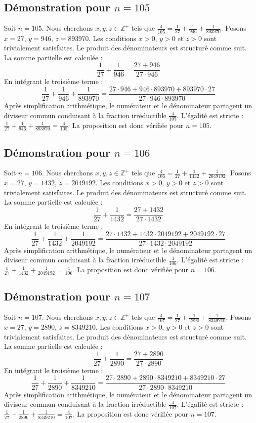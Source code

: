 \documentclass[11pt,a4paper]{article}
\begin{document}
\subsection{Démonstration pour $n = 105$}
Soit $n = 105$. Nous cherchons $x, y, z \in \mathbb{Z}^{+}$ tels que $\frac{4}{105} = \frac{1}{27} + \frac{1}{946} + \frac{1}{893970}$.
Posons $x = 27$, $y = 946$, $z = 893970$.
Les conditions $x > 0$, $y > 0$ et $z > 0$ sont trivialement satisfaites.
Le produit des dénominateurs est structuré comme suit. La somme partielle est calculée :
$$ \frac{1}{27} + \frac{1}{946} = \frac{27+946}{27 \cdot 946} $$
En intégrant le troisième terme :
$$ \frac{1}{27} + \frac{1}{946} + \frac{1}{893970} = \frac{27 \cdot 946 + 946 \cdot 893970 + 893970 \cdot 27}{27 \cdot 946 \cdot 893970} $$
Après simplification arithmétique, le numérateur et le dénominateur partagent un diviseur commun conduisant à la fraction irréductible $\frac{4}{105}$.
L'égalité est stricte : $\frac{1}{27} + \frac{1}{946} + \frac{1}{893970} = \frac{4}{105}$.
La proposition est donc vérifiée pour $n = 105$.
\subsection{Démonstration pour $n = 106$}
Soit $n = 106$. Nous cherchons $x, y, z \in \mathbb{Z}^{+}$ tels que $\frac{4}{106} = \frac{1}{27} + \frac{1}{1432} + \frac{1}{2049192}$.
Posons $x = 27$, $y = 1432$, $z = 2049192$.
Les conditions $x > 0$, $y > 0$ et $z > 0$ sont trivialement satisfaites.
Le produit des dénominateurs est structuré comme suit. La somme partielle est calculée :
$$ \frac{1}{27} + \frac{1}{1432} = \frac{27+1432}{27 \cdot 1432} $$
En intégrant le troisième terme :
$$ \frac{1}{27} + \frac{1}{1432} + \frac{1}{2049192} = \frac{27 \cdot 1432 + 1432 \cdot 2049192 + 2049192 \cdot 27}{27 \cdot 1432 \cdot 2049192} $$
Après simplification arithmétique, le numérateur et le dénominateur partagent un diviseur commun conduisant à la fraction irréductible $\frac{4}{106}$.
L'égalité est stricte : $\frac{1}{27} + \frac{1}{1432} + \frac{1}{2049192} = \frac{4}{106}$.
La proposition est donc vérifiée pour $n = 106$.
\subsection{Démonstration pour $n = 107$}
Soit $n = 107$. Nous cherchons $x, y, z \in \mathbb{Z}^{+}$ tels que $\frac{4}{107} = \frac{1}{27} + \frac{1}{2890} + \frac{1}{8349210}$.
Posons $x = 27$, $y = 2890$, $z = 8349210$.
Les conditions $x > 0$, $y > 0$ et $z > 0$ sont trivialement satisfaites.
Le produit des dénominateurs est structuré comme suit. La somme partielle est calculée :
$$ \frac{1}{27} + \frac{1}{2890} = \frac{27+2890}{27 \cdot 2890} $$
En intégrant le troisième terme :
$$ \frac{1}{27} + \frac{1}{2890} + \frac{1}{8349210} = \frac{27 \cdot 2890 + 2890 \cdot 8349210 + 8349210 \cdot 27}{27 \cdot 2890 \cdot 8349210} $$
Après simplification arithmétique, le numérateur et le dénominateur partagent un diviseur commun conduisant à la fraction irréductible $\frac{4}{107}$.
L'égalité est stricte : $\frac{1}{27} + \frac{1}{2890} + \frac{1}{8349210} = \frac{4}{107}$.
La proposition est donc vérifiée pour $n = 107$.
\end{document}
